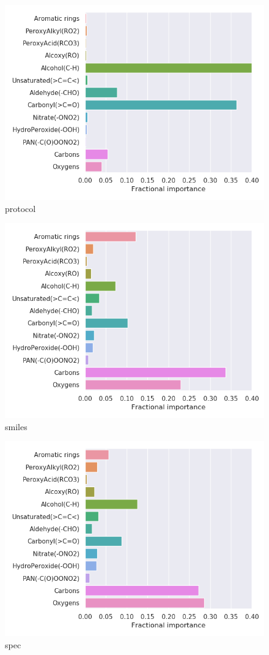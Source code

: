 \begin{subfigure}[b]{0.5\textwidth}
    \centering
    \includegraphics[width=\textwidth]{outputs/AE/protocol/legend.png}
    \caption{protocol}
    \label{fig:legend_AE_protocol}
\end{subfigure}
\begin{subfigure}[b]{0.5\textwidth}
    \centering
    \includegraphics[width=\textwidth]{outputs/AE/smiles/legend.png}
    \caption{smiles}
    \label{fig:legend_AE_smiles}
\end{subfigure}
\begin{subfigure}[b]{0.5\textwidth}
    \centering
    \includegraphics[width=\textwidth]{outputs/AE/spec/legend.png}
    \caption{spec}
    \label{fig:legend_AE_spec}
\end{subfigure}


